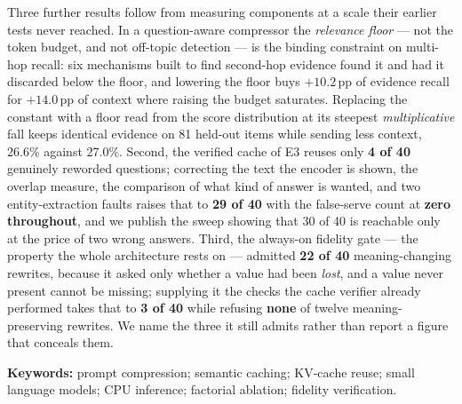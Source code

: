 \documentclass[11pt,a4paper]{article}
\begin{document}
\begin{tcolorbox}[colback=white,colframe=ink,boxrule=0.6pt,arc=2pt,
                  left=10pt,right=10pt,top=8pt,bottom=8pt]
\smallskip
\noindent Three further results follow from measuring components at a scale
their earlier tests never reached. In a question-aware compressor the
\emph{relevance floor} --- not the token budget, and not off-topic detection ---
is the binding constraint on multi-hop recall: six mechanisms built to find
second-hop evidence found it and had it discarded below the floor, and lowering
the floor buys $+10.2$\,pp of evidence recall for $+14.0$\,pp of context where
raising the budget saturates. Replacing the constant with a floor read from the
score distribution at its steepest \emph{multiplicative} fall keeps identical
evidence on 81 held-out items while sending less context, 26.6\% against
27.0\%. Second, the verified cache of E3 reuses only \textbf{4 of 40} genuinely
reworded questions; correcting the text the encoder is shown, the overlap
measure, the comparison of what kind of answer is wanted, and two
entity-extraction faults raises that to \textbf{29 of 40} with the false-serve
count at \textbf{zero throughout}, and we publish the sweep showing that 30 of
40 is reachable only at the price of two wrong answers. Third, the always-on
fidelity gate --- the property the whole architecture rests on --- admitted
\textbf{22 of 40} meaning-changing rewrites, because it asked only whether a
value had been \emph{lost}, and a value never present cannot be missing;
supplying it the checks the cache verifier already performed takes that to
\textbf{3 of 40} while refusing \textbf{none} of twelve meaning-preserving
rewrites. We name the three it still admits rather than report a figure that
conceals them.

\smallskip
\noindent\textbf{Keywords:} prompt compression; semantic caching; KV-cache reuse;
small language models; CPU inference; factorial ablation; fidelity verification.
\end{tcolorbox}

\vspace{4pt}
\end{document}
